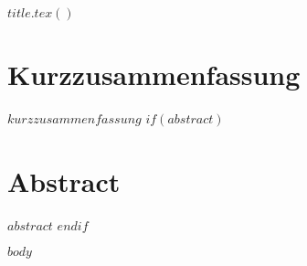 \documentclass[
    paper = a4,
    fontsize = 12pt,
    headinclude = true,
    open = right,
    twoside = false,
    BCOR = 10mm,
    toc = listofnumbered,
    toc = bibnumbered,
    numbers = noendperiod
]{scrreprt}
\begin{document}
    
    $title.tex()$
    
    \section*{Kurzzusammenfassung}
    $kurzzusammenfassung$
    $if(abstract)$
      \section*{Abstract}
      $abstract$
    $endif$
    
    
    \tableofcontents
    
    \cleardoublepage{}
    
    $body$
    
    
    \begin{appendix}
        
        \listoffigures
        \listoftables
        \lstlistoflistings
        
        \printglossary[type=\acronymtype, title=Abkürzungsverzeichnis, toctitle=Abkürzungsverzeichnis, numberedsection] 
        
        {}
        
    \end{appendix}
\end{document}
